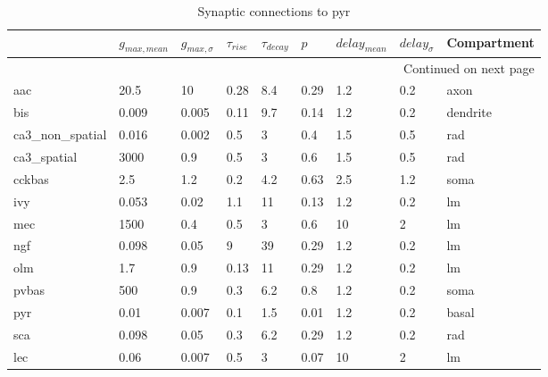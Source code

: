 \begin{longtable}{lllllllll}
\caption{Synaptic connections to pyr}\label{pyr_synapses}\\
\toprule
{} &   $g_{max, mean}$ & $g_{max, \sigma}$ & $\tau_{rise}$ & $\tau_{decay}$ &  $p$ & $delay_{mean}$ & $delay_{\sigma}$ & Compartment \\
\midrule
\endhead
\midrule
\multicolumn{9}{r}{{Continued on next page}} \\
\midrule
\endfoot

\bottomrule
\endlastfoot
aac             &   20.5 &       10 &     0.28 &       8.4 &  0.29 &   1.2 &       0.2 &          axon\ \\
bis             &  0.009 &    0.005 &     0.11 &       9.7 &  0.14 &   1.2 &       0.2 &      dendrite\ \\
ca3\_non\_spatial &  0.016 &    0.002 &      0.5 &         3 &   0.4 &   1.5 &       0.5 &           rad\ \\
ca3\_spatial     &   3000 &      0.9 &      0.5 &         3 &   0.6 &   1.5 &       0.5 &           rad\ \\
cckbas          &    2.5 &      1.2 &      0.2 &       4.2 &  0.63 &   2.5 &       1.2 &          soma\ \\
ivy             &  0.053 &     0.02 &      1.1 &        11 &  0.13 &   1.2 &       0.2 &            lm\ \\
mec             &   1500 &      0.4 &      0.5 &         3 &   0.6 &    10 &         2 &            lm\ \\
ngf             &  0.098 &     0.05 &        9 &        39 &  0.29 &   1.2 &       0.2 &            lm\ \\
olm             &    1.7 &      0.9 &     0.13 &        11 &  0.29 &   1.2 &       0.2 &            lm\ \\
pvbas           &    500 &      0.9 &      0.3 &       6.2 &   0.8 &   1.2 &       0.2 &          soma\ \\
pyr             &   0.01 &    0.007 &      0.1 &       1.5 &  0.01 &   1.2 &       0.2 &         basal\ \\
sca             &  0.098 &     0.05 &      0.3 &       6.2 &  0.29 &   1.2 &       0.2 &           rad\ \\
lec             &   0.06 &    0.007 &      0.5 &         3 &  0.07 &    10 &         2 &            lm\ \\
\end{longtable}

